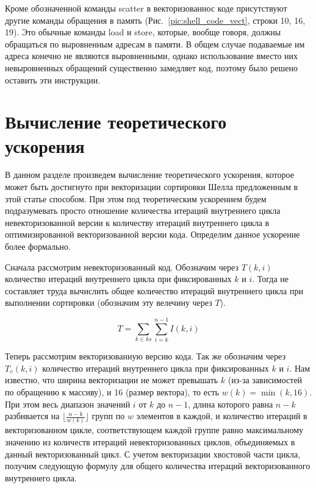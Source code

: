 \documentclass[utf8]{psta}
\begin{document}
Кроме обозначенной команды scatter в векторизованнос коде присутствуют другие команды обращения в память (Рис.~\ref{pic:shell_code_vect}, строки 10, 16, 19). 
Это обычные команды load и store, которые, вообще говоря, должны обращаться по выровненным адресам в памяти. 
В общем случае подаваемые им адреса конечно не являются выровненными, однако использование вместо них невыровненных обращений существенно замедляет код, поэтому было решено оставить эти инструкции.

\section{Вычисление теоретического ускорения}

В данном разделе произведем вычисление теоретического ускорения, которое может быть достигнуто при векторизации сортировки Шелла предложенным в этой статье способом. 
При этом под теоретическим ускорением будем подразумевать просто отношение количества итераций внутреннего цикла невекторизованной версии к количеству итераций внутреннего цикла в оптимизированной векторизованной версии кода. Определим данное ускорение более формально.

Сначала рассмотрим невекторизованный код. Обозначим через $T(k, i)$ количество итераций внутреннего цикла при фиксированных $k$ и $i$. 
Тогда не составляет труда вычислить общее количество итераций внутреннего цикла при выполнении сортировки (обозначим эту велечину через $T$).

\begin{equation}
T = \sum_{k \in ks}{\sum_{i = k}^{n - 1}{I(k, i)}}
\end{equation}

Теперь рассмотрим векторизованную версию кода. 
Так же обозначим через $T_v(k,i)$ количество итераций внутреннего цикла при фиксированных $k$ и $i$. 
Нам известно, что ширина векторизации не может превышать $k$ (из-за зависимостей по обращению к массиву), и 16 (размер вектора), то есть $w(k) = \min(k, 16)$. 
При этом весь диапазон значений $i$ от $k$ до $n - 1$, длина которого равна $n - k$ разбивается на $\lfloor \frac{n - k}{w(k)} \rfloor$ групп по $w$ элементов в каждой, и количество итераций в векторизованном цикле, соответствующем каждой группе равно максимальному значению из количеств итераций невекторизованных циклов, объединяемых в данный векторизованный цикл. 
С учетом векторизации хвостовой части цикла, получим следующую формулу для общего количества итераций векторизованного внутреннего цикла.
\end{document}
